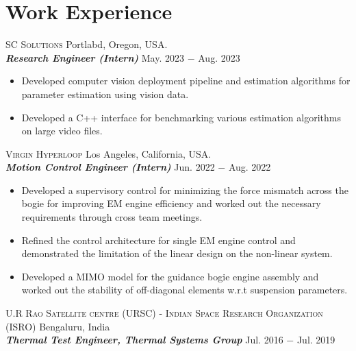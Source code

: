 \documentclass[letterpaper,10pt]{article}
\begin{document}
\section{Work Experience}
\noindent \textsc{SC Solutions} \hfill Portlabd, Oregon, USA.\\
\vspace{3pt}
\textbf{\textit{Research Engineer (Intern)}} \hfill May. 2023 $-$ Aug. 2023
\begin{itemize}[noitemsep,nolistsep,leftmargin=0.25in,label={--}]
    \item Developed computer vision deployment pipeline and estimation algorithms for parameter estimation using vision data.
    \item Developed a C++ interface for benchmarking various estimation algorithms on large video files.
\end{itemize}
\vspace{10pt}
\noindent \textsc{Virgin Hyperloop} \hfill Los Angeles, California, USA.\\
\vspace{3pt}
\textbf{\textit{Motion Control Engineer (Intern)}} \hfill Jun. 2022 $-$ Aug. 2022
\begin{itemize}[noitemsep,nolistsep,leftmargin=0.25in,label={--}]
    \item Developed a supervisory control for minimizing the force mismatch
across the bogie for improving EM engine efficiency and worked out the necessary
requirements through cross team meetings.
\item Refined the control architecture for single EM engine control and
demonstrated the limitation of the linear design on the non-linear system.
\item Developed a MIMO model for the guidance bogie engine assembly and worked
out the stability of off-diagonal elements w.r.t suspension parameters.
\end{itemize}
\vspace{10pt}
\noindent \textsc{U.R Rao Satellite centre (URSC) - Indian Space Research
Organization (ISRO)} \hfill Bengaluru, India \\
\vspace{3pt}
\textbf{\textit{Thermal Test Engineer, Thermal Systems Group}} \hfill Jul. 2016 $-$ Jul. 2019
\end{document}
